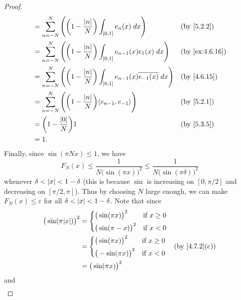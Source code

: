 \begin{proof}
\begin{align*}
     & = \sum_{n = -N}^N \Bigg(\bigg(1 - \dfrac{\abs{n}}{N}\bigg) \int_{[0, 1]} e_n(x) \; dx\Bigg)                            &  & \by{5.2.2}     \\
     & = \sum_{n = -N}^N \Bigg(\bigg(1 - \dfrac{\abs{n}}{N}\bigg) \int_{[0, 1]} e_{n - 1}(x) e_1(x) \; dx\Bigg)               &  & \by{ex:4.6.16} \\
     & = \sum_{n = -N}^N \Bigg(\bigg(1 - \dfrac{\abs{n}}{N}\bigg) \int_{[0, 1]} e_{n - 1}(x) \overline{e_{-1}(x)} \; dx\Bigg) &  & \by{4.6.15}    \\
     & = \sum_{n = -N}^N \Bigg(\bigg(1 - \dfrac{\abs{n}}{N}\bigg) \inner*{e_{n - 1}, e_{-1}}\Bigg)                            &  & \by{5.2.1}     \\
     & = \bigg(1 - \dfrac{\abs{0}}{N}\bigg) 1                                                                                 &  & \by{5.3.5}     \\
     & = 1.
  \end{align*}
  Finally, since \(\sin(\pi N x) \leq 1\), we have
  \[
    F_N(x) \leq \dfrac{1}{N \big(\sin(\pi x)\big)^2} \leq \dfrac{1}{N \big(\sin(\pi \delta)\big)^2}
  \]
  whenever \(\delta < \left\lvert x\right\rvert < 1 - \delta\)
  (this is because \(\sin\) is increasing on \([0, \pi / 2]\) and decreasing on \([\pi / 2, \pi]\)).
  Thus by choosing \(N\) large enough, we can make \(F_N (x) \leq \varepsilon\) for all \(\delta < \left\lvert x\right\rvert < 1 - \delta\).
  Note that since
  \begin{align*}
    \big(\sin(\pi \abs{x})\big)^2 & = \begin{dcases}
                                        \big(\sin(\pi x)\big)^2  & \text{if } x \geq 0 \\
                                        \big(\sin(\pi -x)\big)^2 & \text{if } x < 0
                                      \end{dcases} \\
                                  & = \begin{dcases}
                                        \big(\sin(\pi x)\big)^2  & \text{if } x \geq 0 \\
                                        \big(-\sin(\pi x)\big)^2 & \text{if } x < 0
                                      \end{dcases} &  & \text{(by \cref{4.7.2}(c))} \\
                                  & = \big(\sin(\pi x)\big)^2
  \end{align*}
  and
  \begin{align*}

\end{align*}
\end{proof}
